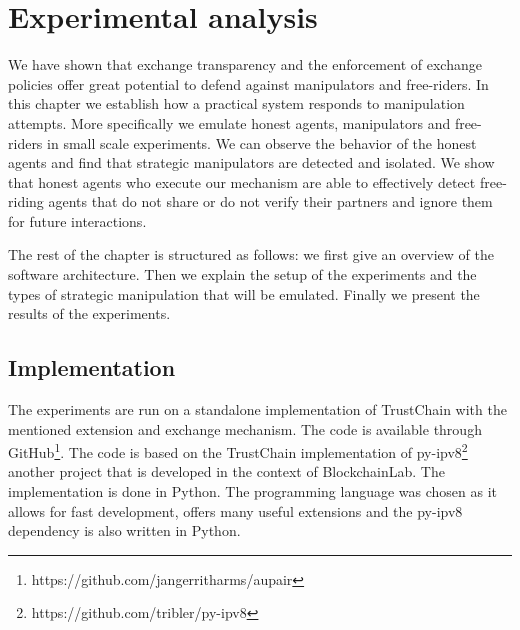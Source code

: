 \chapter{Experimental analysis}
We have shown that exchange transparency and the enforcement of exchange policies offer great potential
to defend against manipulators and free-riders. In this chapter we establish
how a practical system responds to manipulation attempts. More specifically we emulate honest agents,
manipulators and free-riders in small scale experiments. We can observe the behavior of the 
honest agents and find that strategic manipulators are detected and isolated. We show that honest agents who
execute our mechanism are able to effectively detect free-riding agents that do not share or do not verify their partners 
and ignore them for future interactions.

The rest of the chapter is structured as follows: we first give an overview of the software 
architecture. Then we explain the setup of the experiments and the types of strategic manipulation
that will be emulated. Finally we present the results of the experiments.


\section{Implementation}
The experiments are run on a standalone implementation of TrustChain with the mentioned extension
and exchange mechanism. The code is available through GitHub\footnote{https://github.com/jangerritharms/aupair}.
The code is based on the TrustChain implementation of py-ipv8\footnote{https://github.com/tribler/py-ipv8}
another project that is developed in the context of BlockchainLab. The implementation is done in 
Python. The programming language was chosen as it allows for fast development,
offers many useful extensions and the py-ipv8 dependency is also written in Python. 

